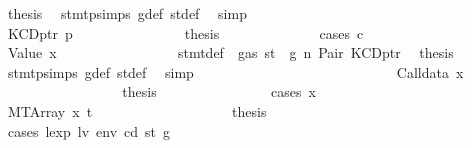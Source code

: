 \begin{isabellebody}
\ {\isacharquery}{\kern0pt}thesis\ \isamarkupfalse%
\ stmt{\isachardot}{\kern0pt}psimps{\isacharparenleft}{\kern0pt}{}{\isacharparenright}{\kern0pt}\ g{\isacharunderscore}{\kern0pt}def\ st{\isacharprime}{\kern0pt}{\isacharunderscore}{\kern0pt}def\ \isamarkupfalse%
\ simp\isanewline
\ \ \ \ \ \ \ \ \ \ \ \ \isamarkupfalse%
\isanewline
\ \ \ \ \ \ \ \ \ \ \isamarkupfalse%
\isanewline
\ \ \ \ \ \ \ \ \ \ \ \ \isamarkupfalse%
\ {\isacharparenleft}{\kern0pt}KCDptr\ p{\isacharparenright}{\kern0pt}\isanewline
\ \ \ \ \ \ \ \ \ \ \ \ \isamarkupfalse%
\ \isamarkupfalse%
\ {\isacharquery}{\kern0pt}thesis\isanewline
\ \ \ \ \ \ \ \ \ \ \ \ \isamarkupfalse%
\ {\isacharparenleft}{\kern0pt}cases\ c{\isacharparenright}{\kern0pt}\isanewline
\ \ \ \ \ \ \ \ \ \ \ \ \ \ \isamarkupfalse%
\ {\isacharparenleft}{\kern0pt}Value\ x{}{\isacharparenright}{\kern0pt}\isanewline
\ \ \ \ \ \ \ \ \ \ \ \ \ \ \isamarkupfalse%
\ {}{\isacharparenleft}{\kern0pt}{}{\isacharparenright}{\kern0pt}\ stmt{\isacharunderscore}{\kern0pt}def\ {\isacharbackquoteopen}{\isasymnot}\ gas\ st\ {\isasymle}\ g{\isacharbackquoteclose}\ n\ Pair\ KCDptr\ \isamarkupfalse%
\ {\isacharquery}{\kern0pt}thesis\ \isamarkupfalse%
\ stmt{\isachardot}{\kern0pt}psimps{\isacharparenleft}{\kern0pt}{}{\isacharparenright}{\kern0pt}\ g{\isacharunderscore}{\kern0pt}def\ st{\isacharprime}{\kern0pt}{\isacharunderscore}{\kern0pt}def\ \isamarkupfalse%
\ simp\isanewline
\ \ \ \ \ \ \ \ \ \ \ \ \isamarkupfalse%
\isanewline
\ \ \ \ \ \ \ \ \ \ \ \ \ \ \isamarkupfalse%
\ {\isacharparenleft}{\kern0pt}Calldata\ x{}{\isacharparenright}{\kern0pt}\isanewline
\ \ \ \ \ \ \ \ \ \ \ \ \ \ \isamarkupfalse%
\ \isamarkupfalse%
\ {\isacharquery}{\kern0pt}thesis\isanewline
\ \ \ \ \ \ \ \ \ \ \ \ \ \ \isamarkupfalse%
\ {\isacharparenleft}{\kern0pt}cases\ x{}{\isacharparenright}{\kern0pt}\isanewline
\ \ \ \ \ \ \ \ \ \ \ \ \ \ \ \ \isamarkupfalse%
\ {\isacharparenleft}{\kern0pt}MTArray\ x\ t{\isacharparenright}{\kern0pt}\isanewline
\ \ \ \ \ \ \ \ \ \ \ \ \ \ \ \ \isamarkupfalse%
\ \isamarkupfalse%
\ {\isacharquery}{\kern0pt}thesis\isanewline
\ \ \ \ \ \ \ \ \ \ \ \ \ \ \ \ \isamarkupfalse%
\ {\isacharparenleft}{\kern0pt}cases\ {\isachardoublequoteopen}lexp\ lv\ env\ cd\ st{\isacharprime}{\kern0pt}{\isacharprime}{\kern0pt}\ g{\isacharprime}{\kern0pt}{\isachardoublequoteclose}{\isacharparenright}{\kern0pt}\isanewline

\end{isabellebody}
